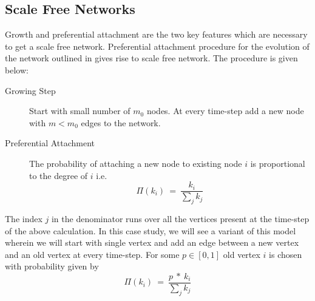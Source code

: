 \documentclass[12pt]{article}
\begin{document}
\subsection{Scale Free Networks}
Growth and preferential attachment are the two key features which are necessary to get a scale free network. Preferential attachment procedure for the evolution of the network outlined in \cite{barabasi} gives rise to scale free network. The procedure is given below:
\begin{description}
	\item [Growing Step] Start with small number of $m_0$ nodes. At every time-step add a new node with $m < m_0$ edges to the network.
	\item [Preferential Attachment] The probability of attaching a new node to existing node $i$ is proportional to the degree of $i$ i.e.
\[
	\Pi(k_i) ~=~ \frac {k_i} {\sum_{j} {k_j}}
\]
\end{description}
The index $j$ in the denominator runs over all the vertices present at the time-step of the above calculation. In this case study, we will see a variant of this model wherein we will start with single vertex and add an edge between a new vertex and an old vertex at every time-step. For some $p \in [0,1]$ old vertex $i$ is chosen with probability given by
\[
	\Pi(k_i) ~=~ \frac {p ~*~ k_i} {\sum_{j} {k_j}}
\]
\end{document}
